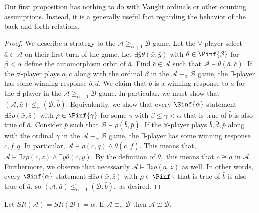 \documentclass[10pt,a4paper]{amsart}
\renewcommand{\-}{\text{-}}
\begin{document}
Our first proposition has nothing to do with Vaught ordinals or other counting assumptions.
Instead, it is a generally useful fact regarding the behavior of the back-and-forth relations.

\uniqueminSR

\begin{proof}
    We describe a strategy to the $\mathcal{A}\geq_{\alpha+1}\mathcal{B}$ game.
    Let the $\forall$-player select $\bar{a}\in\mathcal{A}$ on their first turn of the game.
    Let $\exists\bar{y}\theta(\bar{x},\bar{y})$ with $\theta\in\Pinf{\beta}$ for $\beta<\alpha$ define the automorphism orbit of $\bar{a}$.
    Find $\bar{c}\in\mathcal{A}$ such that $\mathcal{A}\models\theta(\bar{a},\bar{c})$.
    If the $\forall$-player plays $\bar{a},\bar{c}$ along with the ordinal $\beta$ in the $\mathcal{A}\equiv_{\alpha}\mathcal{B}$ game, the $\exists$-player has some winning response $\bar{b},\bar{d}$.
    We claim that $\bar{b}$ is a winning response to $\bar{a}$ for the $\exists$-player in the $\mathcal{A}\geq_{\alpha+1}\mathcal{B}$ game.
    In particular, we must show that $(\mathcal{A},\bar{a})\leq_{\alpha}(\mathcal{B},\bar{b}).$
    Equivalently, we show that every $\Sinf{\alpha}$ statement $\exists \bar{z} \rho(\bar{x},\bar{z})$ with $\rho\in\Pinf{\gamma}$ for some $\gamma$ with $\beta\leq\gamma<\alpha$ that is true of $\bar{b}$ is also true of $\bar{a}$.
    Consider $\bar{p}$ such that $\mathcal{B}\models\rho(\bar{b},\bar{p}).$
    If the $\forall$-player plays $\bar{b},\bar{d},\bar{p}$ along with the ordinal $\gamma$ in the $\mathcal{A}\equiv_{\alpha}\mathcal{B}$ game, the $\exists$-player has some winning response $\bar{c},\bar{f},\bar{q}$.
    In particular, $\mathcal{A}\models \rho(\bar{c},\bar{q})\land \theta(\bar{c},\bar{f})$.
    This means that, $\mathcal{A}\models \exists\bar{z}\rho(\bar{c},\bar{z})\land \exists\bar{y}\theta(\bar{c},\bar{y})$.
    By the definition of $\theta,$ this means that $\bar{c}\cong\bar{a}$ in $\mathcal{A}$.
    Furthermore, we observe that necessarily $\mathcal{A}\models \exists\bar{z}\rho(\bar{a},\bar{z})$ as well.
    In other words, every  $\Sinf{\alpha}$ statement $\exists \bar{z} \rho(\bar{x},\bar{z})$ with $\rho\in\Pinf\gamma$ that is true of $\bar{b}$ is also true of $\bar{a}$, so $(\mathcal{A},\bar{a})\leq_{\alpha+1}(\mathcal{B},\bar{b}),$ as desired.
\end{proof}



\begin{corollary}\label{cor:onlyOneSRalphaPerClass}
        Let $SR(\mathcal{A})=SR(\mathcal{B})=\alpha$. If $\mathcal{A}\equiv_{\alpha}\mathcal{B}$ then $\mathcal{A}\cong\mathcal{B}$.
\end{corollary}
\end{document}
